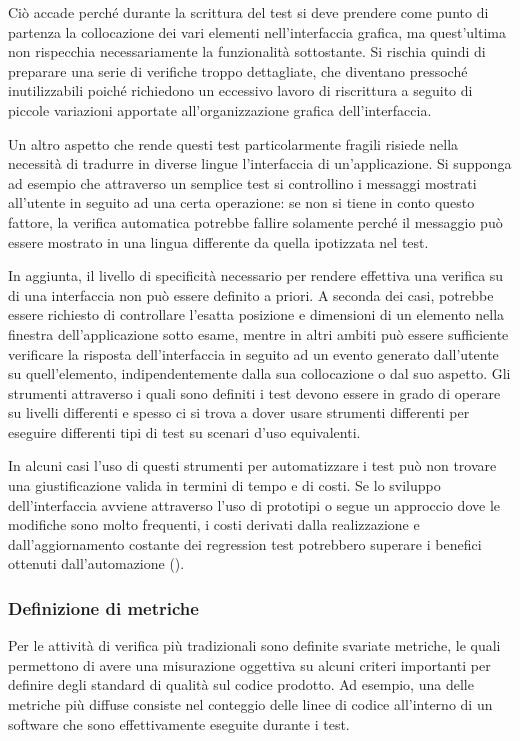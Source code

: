 Ciò accade perché durante la scrittura del test si deve prendere come punto di partenza la collocazione dei vari elementi nell'interfaccia grafica, ma quest'ultima non rispecchia necessariamente la funzionalità sottostante. Si rischia quindi di preparare una serie di verifiche troppo dettagliate, che diventano pressoché inutilizzabili poiché richiedono un eccessivo lavoro di riscrittura a seguito di piccole variazioni apportate all'organizzazione grafica dell'interfaccia.

Un altro aspetto che rende questi test particolarmente fragili risiede nella necessità di tradurre in diverse lingue l'interfaccia di un'applicazione. Si supponga ad esempio che attraverso un semplice test si controllino i messaggi mostrati all'utente in seguito ad una certa operazione: se non si tiene in conto questo fattore, la verifica automatica potrebbe fallire solamente perché il messaggio può essere mostrato in una lingua differente da quella ipotizzata nel test.

In aggiunta, il livello di specificità necessario per rendere effettiva una verifica su di una interfaccia non può essere definito a priori. A seconda dei casi, potrebbe essere richiesto di controllare l'esatta posizione e dimensioni di un elemento nella finestra dell'applicazione sotto esame, mentre in altri ambiti può essere sufficiente verificare la risposta dell'interfaccia in seguito ad un evento generato dall'utente su quell'elemento, indipendentemente dalla sua collocazione o dal suo aspetto.
Gli strumenti attraverso i quali sono definiti i test devono essere in grado di operare su livelli differenti e spesso ci si trova a dover usare strumenti differenti per eseguire differenti tipi di test su scenari d'uso equivalenti.

In alcuni casi l'uso di questi strumenti per automatizzare i test può non trovare una giustificazione valida in termini di tempo e di costi. Se lo sviluppo dell'interfaccia avviene attraverso l'uso di prototipi o segue un approccio dove le modifiche sono molto frequenti, i costi derivati dalla realizzazione e dall'aggiornamento costante dei regression test potrebbero superare i benefici ottenuti dall'automazione (\cite{gerrardGUI}). 

\subsubsection{Definizione di metriche}

Per le attività di verifica più tradizionali sono definite svariate metriche, le quali permettono di avere una misurazione oggettiva su alcuni criteri importanti per definire degli standard di qualità sul codice prodotto. Ad esempio, una delle metriche più diffuse consiste nel conteggio delle linee di codice all'interno di un software che sono effettivamente eseguite durante i test. 

